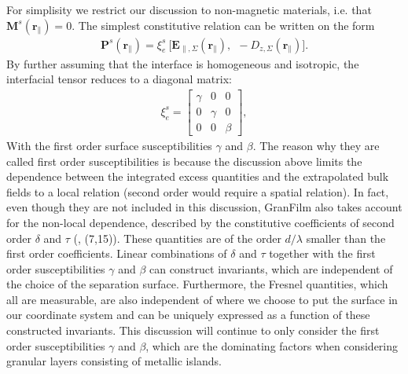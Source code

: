 For simplisity we restrict our discussion to non-magnetic materials,
i.e. that $\boldsymbol{M}^s(\boldsymbol{r}_{\parallel}) = 0$. The simplest constitutive relation
can be written on the form
\begin{align}
   \boldsymbol{P}^s(\boldsymbol{r}\!_{\parallel}) = \xi ^s_e \: \big[ \boldsymbol{E}_{\parallel, \Sigma}(\boldsymbol{r}\!_{\parallel}), \:\: - D\!_{z, \Sigma}(\boldsymbol{r}\!_{\parallel}) \big].
   \label{constitutiveRel}
\end{align}
By further assuming that the interface is homogeneous and isotropic, the interfacial tensor reduces
to a diagonal matrix:
\begin{align}
  \xi ^s_e = 
\begin{bmatrix}
   \gamma   &   0       &  0      \\
   0        &   \gamma  &  0      \\
   0        &   0       &  \beta 
\end{bmatrix}
,
\end{align}
With the first order surface susceptibilities $\gamma$ and $\beta$. The reason why they are called 
first order susceptibilities is because the discussion above limits the dependence between
the integrated excess quantities and the extrapolated bulk fields to a local relation (second order
would require a spatial relation).
In fact, even though they are not included in this discussion, 
GranFilm also takes account for the non-local dependence, described by the constitutive coefficients of
second order $\delta$ and $\tau$ (\cite{Lazzari2002}, (7,15)). These quantities are of the order
$d/\lambda$ smaller than the first order coefficients. 
Linear combinations of $\delta$ and $\tau$ together with the first order susceptibilities 
$\gamma$ and $\beta$ can construct invariants, which are independent of the choice of the separation surface. 
%
Furthermore, the Fresnel quantities, which all are measurable, are also independent of where we 
choose to put the surface in our coordinate system and can be uniquely expressed as a 
function of these constructed invariants.
This discussion will continue to only consider the first order susceptibilities $\gamma$ and $\beta$,
which are the dominating factors when considering granular layers consisting of metallic islands.




